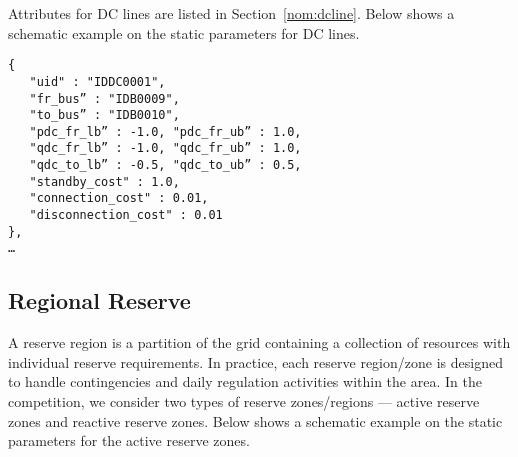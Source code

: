 Attributes for DC lines are listed in Section~\ref{nom:dcline}.
Below shows a schematic example on the static parameters for DC lines.
\begin{verbatim}
{
   "uid" : "IDDC0001",
   "fr_bus” : "IDB0009", 
   "to_bus” : "IDB0010",
   "pdc_fr_lb” : -1.0, "pdc_fr_ub” : 1.0, 
   "qdc_fr_lb” : -1.0, "qdc_fr_ub” : 1.0,
   "qdc_to_lb” : -0.5, "qdc_to_ub” : 0.5,
   "standby_cost" : 1.0,
   "connection_cost" : 0.01,
   "disconnection_cost" : 0.01
},
…    
\end{verbatim}



\subsection{Regional Reserve}
\label{sec:reserve}
A reserve region is a partition of the grid containing a collection of resources with individual reserve requirements.
In practice, each reserve region/zone is designed to handle contingencies and daily regulation activities within the area.
In the competition, we consider two types of reserve zones/regions --- active reserve zones and reactive reserve zones. 
Below shows a schematic example on the static parameters for the active reserve zones. 

